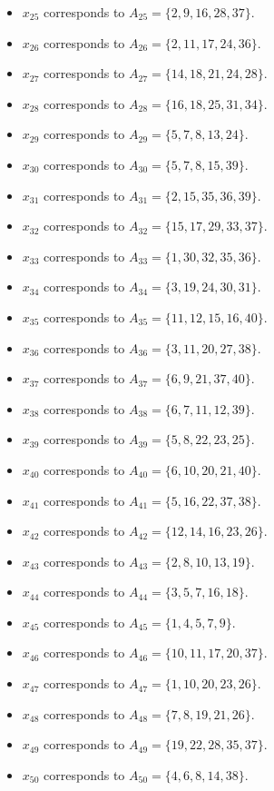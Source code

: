 \documentclass[11pt]{article}
\begin{document}
\begin{itemize}
\item $x_{25}$ corresponds to $A_{25}=\{2, 9, 16, 28, 37\}$.
\item $x_{26}$ corresponds to $A_{26}=\{2, 11, 17, 24, 36\}$.
\item $x_{27}$ corresponds to $A_{27}=\{14, 18, 21, 24, 28\}$.
\item $x_{28}$ corresponds to $A_{28}=\{16, 18, 25, 31, 34\}$.
\item $x_{29}$ corresponds to $A_{29}=\{5, 7, 8, 13, 24\}$.
\item $x_{30}$ corresponds to $A_{30}=\{5, 7, 8, 15, 39\}$.
\item $x_{31}$ corresponds to $A_{31}=\{2, 15, 35, 36, 39\}$.
\item $x_{32}$ corresponds to $A_{32}=\{15, 17, 29, 33, 37\}$.
\item $x_{33}$ corresponds to $A_{33}=\{1, 30, 32, 35, 36\}$.
\item $x_{34}$ corresponds to $A_{34}=\{3, 19, 24, 30, 31\}$.
\item $x_{35}$ corresponds to $A_{35}=\{11, 12, 15, 16, 40\}$.
\item $x_{36}$ corresponds to $A_{36}=\{3, 11, 20, 27, 38\}$.
\item $x_{37}$ corresponds to $A_{37}=\{6, 9, 21, 37, 40\}$.
\item $x_{38}$ corresponds to $A_{38}=\{6, 7, 11, 12, 39\}$.
\item $x_{39}$ corresponds to $A_{39}=\{5, 8, 22, 23, 25\}$.
\item $x_{40}$ corresponds to $A_{40}=\{6, 10, 20, 21, 40\}$.
\item $x_{41}$ corresponds to $A_{41}=\{5, 16, 22, 37, 38\}$.
\item $x_{42}$ corresponds to $A_{42}=\{12, 14, 16, 23, 26\}$.
\item $x_{43}$ corresponds to $A_{43}=\{2, 8, 10, 13, 19\}$.
\item $x_{44}$ corresponds to $A_{44}=\{3, 5, 7, 16, 18\}$.
\item $x_{45}$ corresponds to $A_{45}=\{1, 4, 5, 7, 9\}$.
\item $x_{46}$ corresponds to $A_{46}=\{10, 11, 17, 20, 37\}$.
\item $x_{47}$ corresponds to $A_{47}=\{1, 10, 20, 23, 26\}$.
\item $x_{48}$ corresponds to $A_{48}=\{7, 8, 19, 21, 26\}$.
\item $x_{49}$ corresponds to $A_{49}=\{19, 22, 28, 35, 37\}$.
\item $x_{50}$ corresponds to $A_{50}=\{4, 6, 8, 14, 38\}$.

\end{itemize}
\end{document}
